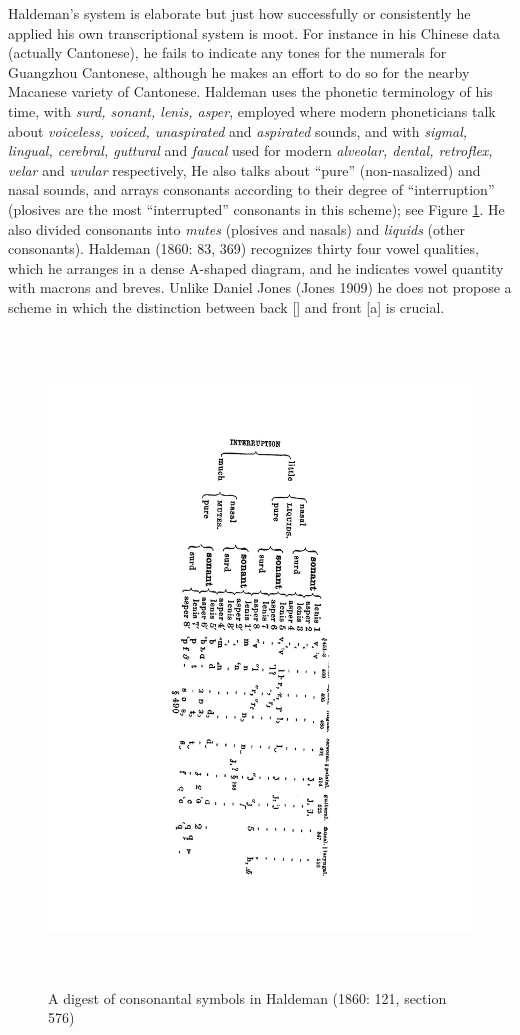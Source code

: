 \documentclass[output=paper]{LSP/langsci}
\begin{document}
Haldeman's system is elaborate but just how successfully or consistently he applied his own transcriptional system is moot. For instance in his Chinese data (actually Cantonese), he fails to indicate any tones for the numerals for Guangzhou Cantonese, although he makes an effort to do so for  the nearby Macanese variety of Cantonese.  Haldeman uses the phonetic terminology of his time, with \textit{surd, sonant, lenis, asper}, employed where modern phoneticians talk about \textit{voiceless, voiced, unaspirated} and \textit{aspirated} sounds, and with \textit{sigmal, lingual, cerebral, guttural} and \textit{faucal} used for modern \textit{alveolar, dental, retroflex, velar} and \textit{uvular} respectively,    He also talks about ``pure'' (non-nasalized) and  nasal  sounds, and arrays consonants according to their degree of ``interruption'' (plosives are the most ``interrupted'' consonants in this scheme); see Figure \ref{haldemandigest}.   He also divided consonants into \textit{mutes} (plosives and nasals) and \textit{liquids} (other consonants).  Haldeman (1860: 83, 369) recognizes thirty four vowel qualities, which he arranges in a dense A-shaped diagram, and he indicates vowel quantity with macrons and breves.   Unlike Daniel Jones (Jones 1909) he does not propose a scheme in which the distinction between back [] and front [a] is crucial.  

\begin{figure}
\centering
\caption{A digest of consonantal symbols in Haldeman (1860: 121, section 576)} \label{haldemandigest}
\includegraphics[height=6.8in]{figures/GrantConsonants}
\end{figure}
\end{document}
